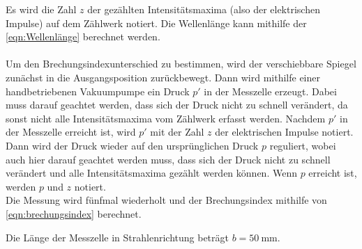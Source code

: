     Es wird die Zahl $z$ der gezählten Intensitätsmaxima (also der elektrischen Impulse) auf dem Zählwerk notiert.
    Die Wellenlänge kann mithilfe der \autoref{eqn:Wellenlänge} berechnet werden.\\
    \\
    Um den Brechungsindexunterschied zu bestimmen,
    wird der verschiebbare Spiegel zunächst in die Ausgangsposition zurückbewegt.
    Dann wird mithilfe einer handbetriebenen Vakuumpumpe ein Druck $p'$ in der Messzelle erzeugt.
    Dabei muss darauf geachtet werden,
    dass sich der Druck nicht zu schnell verändert,
    da sonst nicht alle Intensitätsmaxima vom Zählwerk erfasst werden.
    Nachdem $p'$ in der Messzelle erreicht ist,
    wird $p'$ mit der Zahl $z$ der elektrischen Impulse notiert.
    Dann wird der Druck wieder auf den ursprünglichen Druck $p$ reguliert,
    wobei auch hier darauf geachtet werden muss,
    dass sich der Druck nicht zu schnell verändert und alle Intensitätsmaxima gezählt werden können.
    Wenn $p$ erreicht ist,
    werden $p$ und $z$ notiert.\\
    Die Messung wird fünfmal wiederholt und der Brechungsindex mithilfe von \autoref{eqn:brechungsindex} berechnet.

    Die Länge der Messzelle in Strahlenrichtung beträgt $b = \SI{50}{\milli\meter}$.
